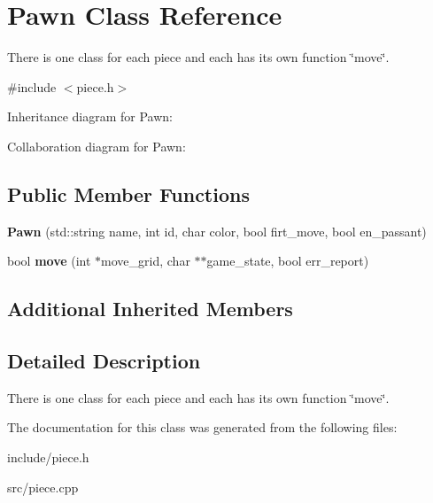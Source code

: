 \hypertarget{classPawn}{}\section{Pawn Class Reference}
\label{classPawn}


There is one class for each piece and each has its own function \char`\"{}move\char`\"{}.  




{\ttfamily \#include $<$piece.\+h$>$}



Inheritance diagram for Pawn\+:


Collaboration diagram for Pawn\+:
\subsection*{Public Member Functions}
\begin{DoxyCompactItemize}
\item 
\mbox{\label{classPawn_a8c34b407e2eb155481abc3638abdffca}} 
{\bfseries Pawn} (std\+::string name, int id, char color, bool firt\+\_\+move, bool en\+\_\+passant)
\item 
\mbox{\label{classPawn_ae046373685b1339fda8efe7065cc7bb2}} 
bool {\bfseries move} (int $\ast$move\+\_\+grid, char $\ast$$\ast$game\+\_\+state, bool err\+\_\+report)
\end{DoxyCompactItemize}
\subsection*{Additional Inherited Members}


\subsection{Detailed Description}
There is one class for each piece and each has its own function \char`\"{}move\char`\"{}. 

The documentation for this class was generated from the following files\+:\begin{DoxyCompactItemize}
\item 
include/piece.\+h\item 
src/piece.\+cpp\end{DoxyCompactItemize}
